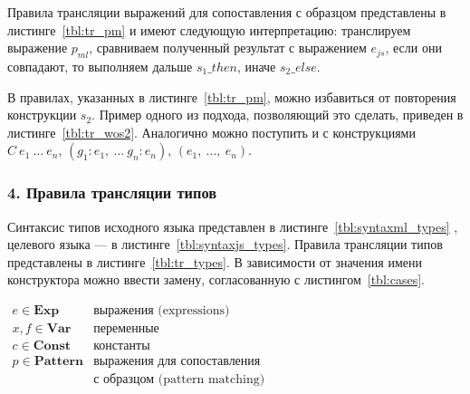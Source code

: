 Правила трансляции выражений для сопоставления с образцом представлены в листинге~\ref{tbl:tr_pm} и имеют следующую интерпретацию: 
транслируем выражение $p_{ml}$, сравниваем полученный результат с выражением $e_{js}$, если они совпадают, то выполняем дальше $s_1\_then$, иначе $s_2\_else$.

В правилах, указанных в листинге~\ref{tbl:tr_pm}, можно избавиться от повторения конструкции $s_2$. Пример одного из подхода, позволяющий это сделать, приведен в листинге~\ref{tbl:tr_wos2}. Аналогично можно поступить и с конструкциями $C~e_1~\ldots~e_n$, $(g_1:e_1,~\ldots~g_n:e_n)$, $(e_1,~\ldots,~e_n)$.

\subsubsection*{4. Правила трансляции типов}

Синтаксис типов исходного языка представлен в листинге~\ref{tbl:syntaxml_types} , целевого языка --- в листинге~\ref{tbl:syntaxjs_types}. 
Правила трансляции типов представлены в листинге~\ref{tbl:tr_types}. В зависимости от значения имени конструктора можно ввести замену, согласованную с листингом~\ref{tbl:cases}.


\begin{center}
$
\begin{array}{ll}
e \in \textbf{Exp}  & \mbox{выражения (expressions)}\\
x,f \in \textbf{Var} & \mbox{переменные}\\
c \in \textbf{Const}  & \mbox{константы}\\
p \in \textbf{Pattern}  & \mbox{выражения для сопоставления}\\ 
                        & \mbox{с образцом (pattern matching)}
\end{array}
$
\captionsetup{type=lstlisting}
\label{tbl:notation1}
\end{center}

